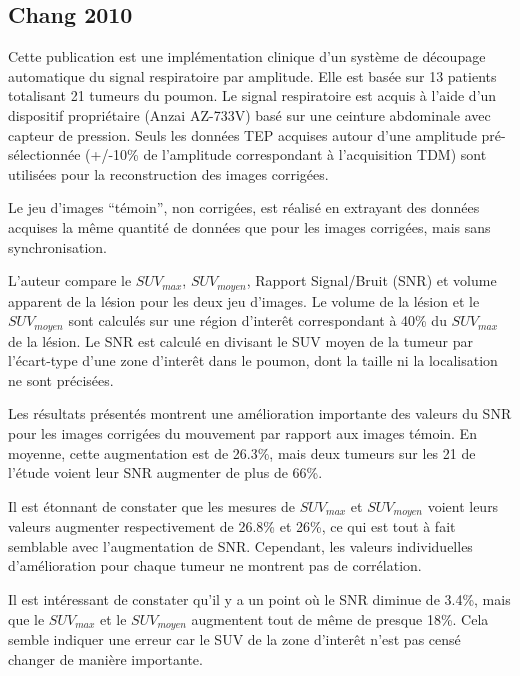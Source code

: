 \subsection{Chang 2010}

Cette publication est une implémentation clinique d'un système de découpage automatique du signal respiratoire par amplitude. Elle est basée sur 13 patients totalisant 21 tumeurs du poumon. Le signal respiratoire est acquis à l'aide d'un dispositif propriétaire (Anzai AZ-733V) basé sur une ceinture abdominale avec capteur de pression. Seuls les données TEP acquises autour d'une amplitude pré-sélectionnée (+/-10\% de l'amplitude correspondant à l'acquisition TDM) sont utilisées pour la reconstruction des images corrigées. 

Le jeu d'images ``témoin'', non corrigées, est réalisé en extrayant des données acquises la même quantité de données que pour les images corrigées, mais sans synchronisation.

L'auteur compare le $SUV_{max}$, $SUV_{moyen}$, Rapport Signal/Bruit (SNR) et volume apparent de la lésion pour les deux jeu d'images. Le volume de la lésion et le $SUV _{moyen}$ sont calculés sur une région d'interêt correspondant à 40\% du $SUV_{max}$ de la lésion. Le SNR est calculé en divisant le SUV moyen de la tumeur par l'écart-type d'une zone d'interêt dans le poumon, dont la taille ni la localisation ne sont précisées. 

Les résultats présentés montrent une amélioration importante des valeurs du SNR pour les images corrigées du mouvement par rapport aux images témoin. En moyenne, cette augmentation est de 26.3\%, mais deux tumeurs sur les 21 de l'étude voient leur SNR augmenter de plus de 66\%. 

Il est étonnant de constater que les mesures de $SUV_{max}$ et $SUV_{moyen}$ voient leurs valeurs augmenter respectivement de 26.8\% et 26\%, ce qui est tout à fait semblable avec l'augmentation de SNR. Cependant, les valeurs individuelles d'amélioration  pour chaque tumeur ne montrent pas de corrélation.

Il est intéressant de constater qu'il y a un point où le SNR diminue de 3.4\%, mais que le $SUV_{max}$ et le $SUV_{moyen}$ augmentent tout de même de presque 18\%. Cela semble indiquer une erreur car le SUV de la zone d'interêt n'est pas censé changer de manière importante.
